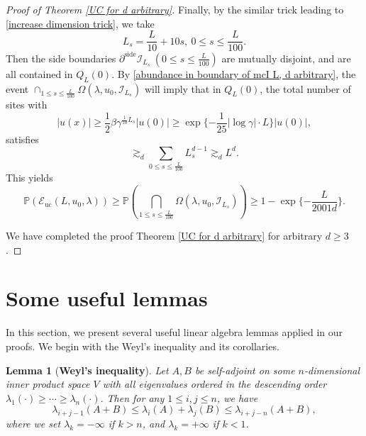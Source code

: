 \documentclass[11pt,reqno,UTF8,twoside]{amsart}
\renewcommand{\P}{\mathbb{P}}
\newcommand{\mcI}{\mathcal{I}}
\newcommand{\partialside}{\partial^{\text{side}}}
\newtheorem{lem}[thm]{Lemma}
\theoremstyle{definition}
\numberwithin{equation}{section}
\begin{document}
\begin{proof}[Proof of Theorem \ref{UC for d arbitrary}]
Finally, by the  similar trick leading  to \eqref{increase dimension trick}, we take 
 \[L_s=  \frac{L}{10}+10s, \ 0\leq s\leq \frac{L}{100}. \] 
Then the side boundaries $\partialside \mcI_{L_s}\ (0\leq s\leq \frac{L}{100})$ are mutually disjoint, and are all contained in $Q_L(0)$. By \eqref{abundance in boundary of mcI L, d arbitrary}, the event 
$\cap_{1\leq s\leq \frac{L}{100}}\Omega(\lambda,u_0,\mcI_{L_s}) $ will imply that in $Q_L(0)$,  the total number of  sites with  
\begin{equation*}
  |u(x)|\geq \frac{1}{2}\beta \gamma^{\frac{1}{10}L_s} |u(0)| \geq \exp \{{-\frac{1}{25}|\log \gamma|\cdot L}\}  |u(0)|,
\end{equation*}
satisfies 
\[  \gtrsim_d \sum_{ 0\leq s\leq \frac{L}{100}} L_s^{d-1}\gtrsim_d L^d .\]
This yields  
\begin{equation*}
    \P \left(\mathcal{E}_{\mathrm{uc}}(L , u_0, \lambda)\right)\geq \P\left(\bigcap_{1\leq s\leq \frac{L}{100}}\Omega(\lambda,u_0,\mcI_{L_s}) \right) \geq 1-\exp\{-\frac{L}{2001d}\}.
\end{equation*}

We  have completed the proof  Theorem \ref{UC for d arbitrary} for arbitrary $d\geq 3$.


















\end{proof}




















\section{Some useful  lemmas}
In this section, we present several useful linear algebra lemmas  applied in our proofs. We begin with  the Weyl's inequality and its corollaries.
\begin{lem}[{\bf Weyl's inequality}]\label{Weyl inequality lemma}
  Let \( A, B \) be self-adjoint on some $n$-dimensional  inner product space \( V \)  
with all  eigenvalues ordered in the descending order  $\lambda_1(\cdot) \geq \cdots \geq \lambda_n(\cdot).$ Then for any   \(1 \leq i, j \leq n\), we have
\begin{equation}\label{Weyl inequality}
  \lambda_{i+j-1}(A+B) \leq \lambda_i(A) + \lambda_j(B) \leq \lambda_{i+j-n}(A+B),
\end{equation}
where we set  \(\lambda_k = -\infty\) if \(k > n\),  and \(\lambda_k = +\infty\) if \(k < 1\).
\end{lem}
\end{document}
